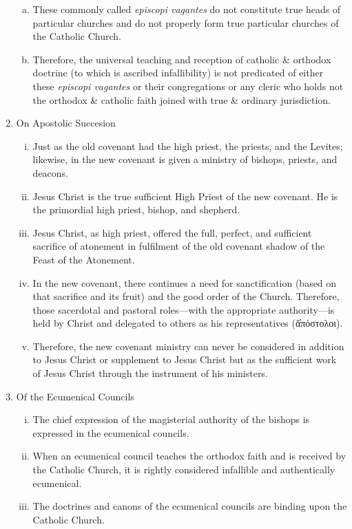 \begin{enumerate}
\begin{enumerate}[a.]
			\item These commonly called \textit{episcopi vagantes} do not constitute true heads of particular churches and do not properly form true particular churches of the Catholic Church.
			\item Therefore, the universal teaching and reception of catholic \& orthodox doctrine (to which is ascribed infallibility) is not predicated of either these \textit{episcopi vagantes} or their congregations or any cleric who holds not the orthodox \& catholic faith joined with true \& ordinary jurisdiction.
		\end{enumerate}
	\item On Apostolic Succesion
		\begin{enumerate}[i.]
				\item Just as the old covenant had the high priest, the priests, and the Levites; likewise, in the new covenant is given a ministry of bishops, priests, and deacons.
				\item Jesus Christ is the true sufficient High Priest of the new covenant. He is the primordial high priest, bishop, and shepherd.
				\item Jesus Christ, as high priest, offered the full, perfect, and sufficient sacrifice of atonement in fulfilment of the old covenant shadow of the Feast of the Atonement.
				\item In the new covenant, there continues a need for sanctification (based on that sacrifice and its fruit) and the good order of the Church. Therefore, those sacerdotal and pastoral roles---with the appropriate authority---is held by Christ and delegated to others as his representatives (ᾰ̓πόστολοι).
				\item Therefore, the new covenant ministry can never be considered in addition to Jesus Christ or supplement to Jesus Christ but as the sufficient work of Jesus Christ through the instrument of his ministers.
		\end{enumerate}
	\item Of the Ecumenical Councils
	\begin{enumerate}[i.]
		\item The chief expression of the magisterial authority of the bishops is expressed in the ecumenical councils.
		\item When an ecumenical council teaches the orthodox faith and is received by the Catholic Church, it is rightly considered infallible and authentically ecumenical.
		\item The doctrines and canons of the ecumenical councils are binding upon the Catholic Church.

\end{enumerate}
\end{enumerate}
